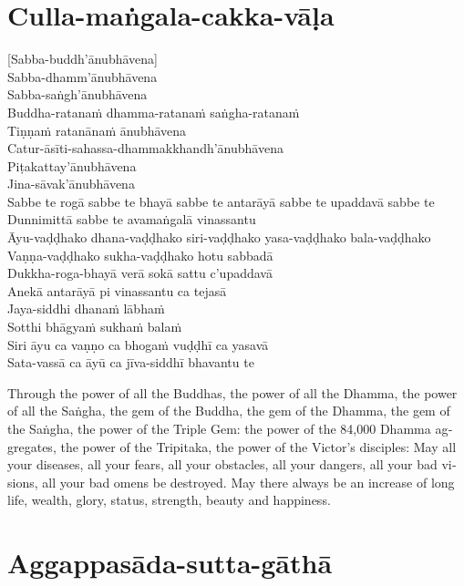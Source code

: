 
\section{Culla-maṅgala-cakka-vāḷa}

[Sabba-buddh'ānubhāvena]\\
Sabba-dhamm'ānubhāvena\\
Sabba-saṅgh'ānubhāvena\\
Buddha-ratanaṁ dhamma-ratanaṁ saṅgha-ratanaṁ\\
Tiṇṇaṁ ratanānaṁ ānubhāvena\\
Catur-āsīti-sahassa-dhammakkhandh'ānubhāvena\\
Piṭakattay'ānubhāvena\\
Jina-sāvak'ānubhāvena\\
Sabbe te rogā sabbe te bhayā sabbe te antarāyā sabbe te upaddavā sabbe te\\
Dunnimittā sabbe te avamaṅgalā vinassantu\\
Āyu-vaḍḍhako dhana-vaḍḍhako siri-vaḍḍhako yasa-vaḍḍhako bala-vaḍḍhako\\
Vaṇṇa-vaḍḍhako sukha-vaḍḍhako hotu sabbadā\\
Dukkha-roga-bhayā verā sokā sattu c'upaddavā\\
Anekā antarāyā pi vinassantu ca tejasā\\
Jaya-siddhi dhanaṁ lābhaṁ\\
Sotthi bhāgyaṁ sukhaṁ balaṁ\\
Siri āyu ca vaṇṇo ca bhogaṁ vuḍḍhī ca yasavā\\
Sata-vassā ca āyū ca jīva-siddhī bhavantu te

\begin{english}
  Through the power of all the Buddhas, the power of all the Dhamma, the power of all the Saṅgha, the gem of the Buddha, the gem of the Dhamma, the gem of the Saṅgha, the power of the Triple Gem: the power of the 84,000 Dhamma aggregates, the power of the Tripitaka, the power of the Victor’s disciples: May all your diseases, all your fears, all your obstacles, all your dangers, all your bad visions, all your bad omens be destroyed. May there always be an increase of long life, wealth, glory, status, strength, beauty and happiness.
\end{english}


\section{Aggappasāda-sutta-gāthā}

